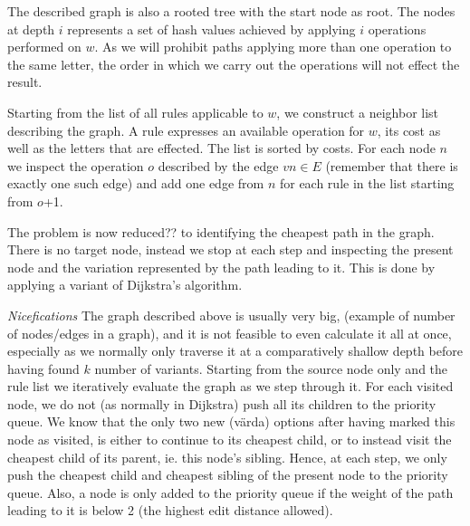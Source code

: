 \documentclass[10pt,a5paper,twoside]{article}
\begin{document}
The described graph is also a rooted tree with the start node as root.
The nodes at depth $i$ represents a set of hash values achieved by applying $i$
operations performed on $w$.
As we will prohibit paths %
applying more than one operation to the same letter, the order in which we
carry out the operations will not effect the result.

Starting from the list of all rules applicable to $w$, we construct a neighbor
list describing the graph. A rule expresses an available operation for $w$, its
cost as well as the letters that are effected. 
The list is sorted by costs. %
For each node $n$ we inspect the operation $o$ described by the edge $vn \in E$
(remember that there is exactly one such edge) and add one edge from $n$ for
each rule in the list starting from $o$+1.

The problem is now reduced?? to identifying the cheapest path in the graph. 
There is no target node, instead we stop at each step and
inspecting the present node and the variation represented by the path leading
to it. This is done by applying a variant of Dijkstra's algorithm. 


\textit{Nicefications}
The graph described above is usually very big, (example of number of nodes/edges in a
graph), and it is not feasible to even calculate it all at once, especially as we
normally only traverse it at a comparatively shallow depth before having found $k$
number of variants.
Starting from the source node only and the rule list we iteratively evaluate
the graph as we step through it. For each visited node, we do not (as normally
in Dijkstra) push all its children to the priority queue. We know
that the only two new (värda) options after having marked this node as visited, is either to
continue to its cheapest child, or to instead visit the cheapest child of its parent, ie.
this node's sibling. Hence, at each step, we only push the
cheapest child and cheapest sibling of the present node to the priority queue.
Also, a node is only added to the priority queue if the weight of the path
leading to it is below 2 (the highest edit distance allowed).
\end{document}
